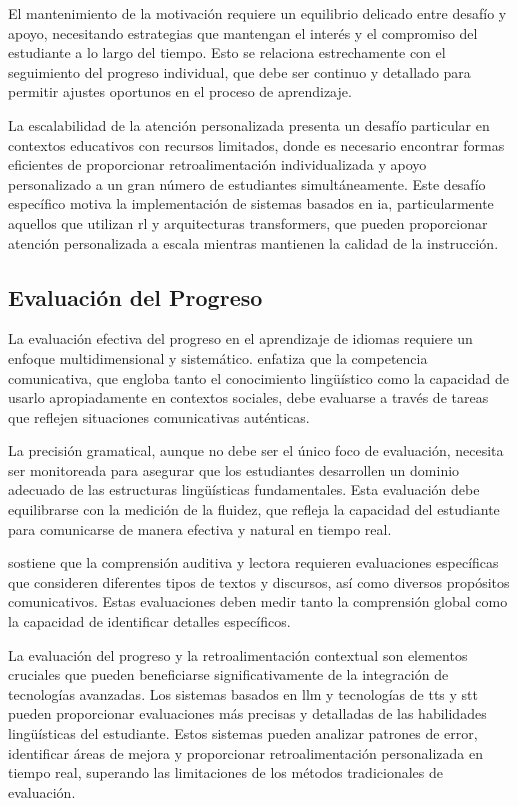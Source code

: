 El mantenimiento de la motivación requiere un equilibrio delicado entre desafío y apoyo, necesitando estrategias que mantengan el interés y el compromiso del estudiante a lo largo del tiempo. Esto se relaciona estrechamente con el seguimiento del progreso individual, que debe ser continuo y detallado para permitir ajustes oportunos en el proceso de aprendizaje.

La escalabilidad de la atención personalizada presenta un desafío particular en contextos educativos con recursos limitados, donde es necesario encontrar formas eficientes de proporcionar retroalimentación individualizada y apoyo personalizado a un gran número de estudiantes simultáneamente. Este desafío específico motiva la implementación de sistemas basados en \gls{ia}, particularmente aquellos que utilizan \gls{rl} y arquitecturas \gls{transformers}, que pueden proporcionar atención personalizada a escala mientras mantienen la calidad de la instrucción.

\subsection{Evaluación del Progreso}

La evaluación efectiva del progreso en el aprendizaje de idiomas requiere un enfoque multidimensional y sistemático. \cite{ellis1994study} enfatiza que la competencia comunicativa, que engloba tanto el conocimiento lingüístico como la capacidad de usarlo apropiadamente en contextos sociales, debe evaluarse a través de tareas que reflejen situaciones comunicativas auténticas.

La precisión gramatical, aunque no debe ser el único foco de evaluación, necesita ser monitoreada para asegurar que los estudiantes desarrollen un dominio adecuado de las estructuras lingüísticas fundamentales. Esta evaluación debe equilibrarse con la medición de la fluidez, que refleja la capacidad del estudiante para comunicarse de manera efectiva y natural en tiempo real.

\cite{krashen1982principles} sostiene que la comprensión auditiva y lectora requieren evaluaciones específicas que consideren diferentes tipos de textos y discursos, así como diversos propósitos comunicativos. Estas evaluaciones deben medir tanto la comprensión global como la capacidad de identificar detalles específicos.

La evaluación del progreso y la retroalimentación contextual son elementos cruciales que pueden beneficiarse significativamente de la integración de tecnologías avanzadas. Los sistemas basados en \gls{llm} y tecnologías de \gls{tts} y \gls{stt} pueden proporcionar evaluaciones más precisas y detalladas de las habilidades lingüísticas del estudiante. Estos sistemas pueden analizar patrones de error, identificar áreas de mejora y proporcionar retroalimentación personalizada en tiempo real, superando las limitaciones de los métodos tradicionales de evaluación.




